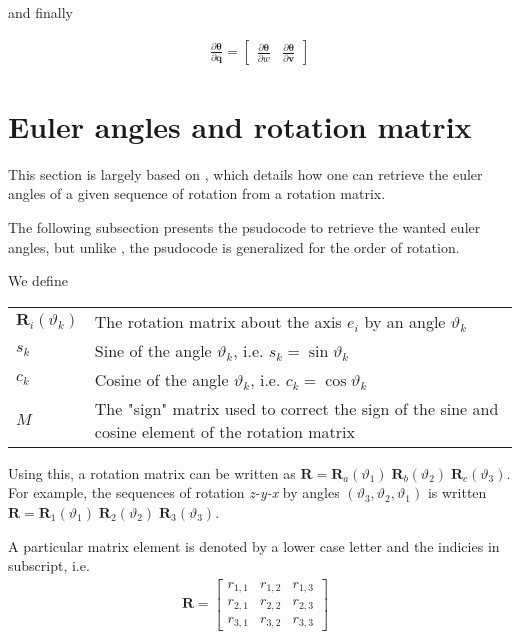\documentclass{article}
\renewcommand\aa{\bm{\theta}}
\renewcommand\t{\vartheta}
\newcommand\R{\bm{R}}
\newcommand\q{\bm{q}}
\renewcommand\v{\bm{v}}
\begin{document}
and finally

\begin{align}
  \frac{\partial \aa}{\partial \q} = 
    \begin{bmatrix}
      \frac{\partial \aa}{\partial w} &
      \frac{\partial \aa}{\partial \v}
    \end{bmatrix}
\end{align}

\section{Euler angles and rotation matrix}

This section is largely based on \cite{eberly_euler_nodate}, which details how
one can retrieve the euler angles of a given sequence of rotation from a rotation matrix.

The following subsection presents the psudocode to retrieve the wanted euler angles, but 
unlike \cite{eberly_euler_nodate}, the psudocode is generalized for the order of rotation.

We define

\begin{tabular}{l p{15cm}}
  $\R_i(\t_k)$ & The rotation matrix about the axis $e_i$ by an angle $\t_k$ \\
  $s_k$ & Sine of the angle $\t_k$, i.e. $s_k = \sin \t_k$\\
  $c_k$ & Cosine of the angle $\t_k$, i.e. $c_k = \cos \t_k$\\
  $M$ & The "sign" matrix used to correct the sign of the sine and cosine element of the rotation matrix \\
\end{tabular}

Using this, a rotation matrix can be written as $\R = \R_a(\t_1) \; \R_b(\t_2) \; \R_c(\t_3)$.
For example, the sequences of rotation \textit{z-y-x} by angles $(\t_3, \t_2, \t_1)$ is written
$\R = \R_1(\t_1) \; \R_2(\t_2) \; \R_3(\t_3)$.


A particular matrix element is denoted by a lower case letter and the indicies in subscript, i.e.
\begin{align}
  \R = \begin{bmatrix} 
    r_{1,1} & r_{1,2} & r_{1,3} \\
    r_{2,1} & r_{2,2} & r_{2,3} \\
    r_{3,1} & r_{3,2} & r_{3,3}
  \end{bmatrix} \text{       }
\end{align}
\end{document}
